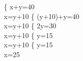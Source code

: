 \left \{  {x+y=40 \\x=y+10} \; \rightarrow 
\left \{ {(y+10)+y=40 \\x=y+10}\; \rightarrow 
\left \{ {2y=30 \\x=y+10} \; \rightarrow 
\left \{ {y=15 \\x=y+10} \; \rightarrow 
\left \{ {y=15 \\x=25}